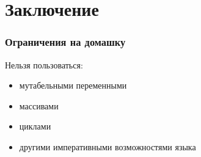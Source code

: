 \documentclass[xetex,mathserif,serif]{beamer}
\begin{document}
	\section{Заключение}

	\begin{frame}
		\frametitle{Ограничения на домашку}
		Нельзя пользоваться:
		\begin{itemize}
			\item мутабельными переменными
			\item массивами
			\item циклами
			\item другими императивными возможностями языка
		\end{itemize}
	\end{frame}
\end{document}
